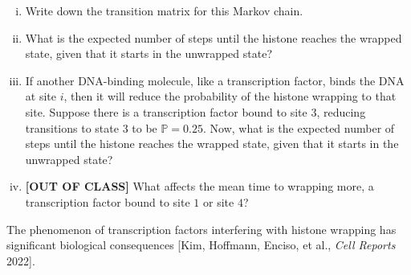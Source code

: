 \documentclass[12pt,letterpaper]{article}
\begin{document}
\begin{enumerate}[A.]
\begin{enumerate}[i.]
  \item Write down the transition matrix for this Markov chain.
  \item What is the expected number of steps until the histone reaches the wrapped state, given that it starts in the unwrapped state?
  \item If another DNA-binding molecule, like a transcription factor, binds the DNA at site $i$, then it will reduce the probability of the histone wrapping to that site. 
  Suppose there is a transcription factor bound to site $3$, reducing transitions to state $3$ to be $\mathbb{P}=0.25$. 
  Now, what is the expected number of steps until the histone reaches the wrapped state, given that it starts in the unwrapped state?
  \item \textbf{[OUT OF CLASS]} What affects the mean time to wrapping more, a transcription factor bound to site $1$ or site $4$?
\end{enumerate}

The phenomenon of transcription factors interfering with histone wrapping has significant biological consequences [Kim, Hoffmann, Enciso, et al., \textit{Cell Reports} 2022].

\end{enumerate} %
\end{document}

